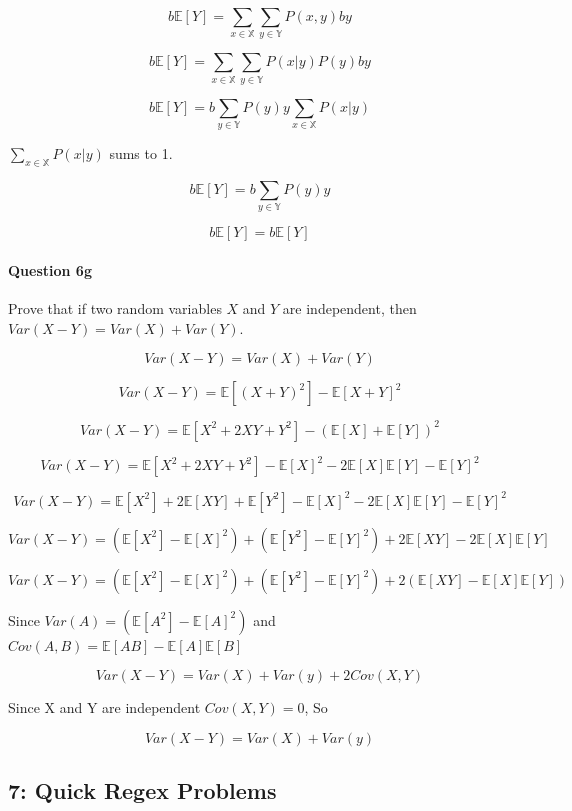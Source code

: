 \documentclass[11pt]{article}
\begin{document}
    \[b\mathbb{E}[Y] = \sum_{x \in \mathbb{X}}\sum_{y \in \mathbb{Y}}P(x, y)by\]

\[b\mathbb{E}[Y] = \sum_{x \in \mathbb{X}}\sum_{y \in \mathbb{Y}}P(x | y)P(y)by\]

\[b\mathbb{E}[Y] = b\sum_{y \in \mathbb{Y}}P(y)y\sum_{x \in \mathbb{X}}P(x | y)\]

\(\sum_{x \in \mathbb{X}}P(x | y)\) sums to 1.

\[b\mathbb{E}[Y] = b\sum_{y \in \mathbb{Y}}P(y)y\]

\[b\mathbb{E}[Y] = b\mathbb{E}[Y]\]

    \paragraph{Question 6g}\label{question-6g}

Prove that if two random variables \(X\) and \(Y\) are independent, then
\(Var(X - Y) = Var(X) + Var(Y)\).

    \[Var(X - Y) = Var(X) + Var(Y)\]

\[Var(X - Y) = \mathbb{E}[(X + Y)^2] - \mathbb{E}[X + Y]^2\]

\[Var(X - Y) = \mathbb{E}[X^2 + 2XY + Y^2] - (\mathbb{E}[X] + \mathbb{E}[Y])^2\]

\[Var(X - Y) = \mathbb{E}[X^2 + 2XY + Y^2] - \mathbb{E}[X]^2 - 2\mathbb{E}[X]\mathbb{E}[Y] - \mathbb{E}[Y]^2\]

\[Var(X - Y) = \mathbb{E}[X^2] + 2\mathbb{E}[XY] + \mathbb{E}[Y^2] - \mathbb{E}[X]^2 - 2\mathbb{E}[X]\mathbb{E}[Y] - \mathbb{E}[Y]^2\]

\[Var(X - Y) = (\mathbb{E}[X^2] - \mathbb{E}[X]^2)+  (\mathbb{E}[Y^2] - \mathbb{E}[Y]^2) + 2\mathbb{E}[XY]  - 2\mathbb{E}[X]\mathbb{E}[Y] \]

\[Var(X - Y) = (\mathbb{E}[X^2] - \mathbb{E}[X]^2)+  (\mathbb{E}[Y^2] - \mathbb{E}[Y]^2) + 2(\mathbb{E}[XY]  - \mathbb{E}[X]\mathbb{E}[Y]) \]

Since \(Var(A) = (\mathbb{E}[A^2] - \mathbb{E}[A]^2)\) and
\(Cov(A, B) = \mathbb{E}[AB] - \mathbb{E}[A]\mathbb{E}[B]\)

\[Var(X - Y) = Var(X) + Var(y) + 2Cov(X,Y) \]

Since X and Y are independent \(Cov(X,Y) = 0\), So

\[Var(X - Y) = Var(X) + Var(y)\]

    \subsection{7: Quick Regex Problems}\label{quick-regex-problems}
\end{document}
